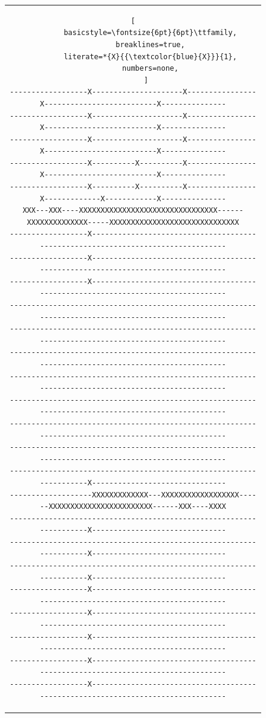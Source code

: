 \documentclass[12pt,a4paper]{article}
\begin{document}
\begin{figure}[H]
\begin{tabular}{c}
\begin{lstlisting}[
        basicstyle=\fontsize{6pt}{6pt}\ttfamily,
        breaklines=true,
        literate=*{X}{{\textcolor{blue}{X}}}{1},
        numbers=none,
      ]
------------------X---------------------X----------------X--------------------------X---------------
------------------X---------------------X----------------X--------------------------X---------------
------------------X---------------------X----------------X--------------------------X---------------
------------------X----------X----------X----------------X--------------------------X---------------
------------------X----------X----------X----------------X-------------X------------X---------------
XXX---XXX----XXXXXXXXXXXXXXXXXXXXXXXXXXXXXXXX------XXXXXXXXXXXXXX-----XXXXXXXXXXXXXXXXXXXXXXXXXXXXXX
------------------X---------------------------------------------------------------------------------
------------------X---------------------------------------------------------------------------------
------------------X---------------------------------------------------------------------------------
----------------------------------------------------------------------------------------------------
----------------------------------------------------------------------------------------------------
----------------------------------------------------------------------------------------------------
----------------------------------------------------------------------------------------------------
----------------------------------------------------------------------------------------------------
----------------------------------------------------------------------------------------------------
----------------------------------------------------------------------------------------------------
--------------------------------------------------------------------X-------------------------------
-------------------XXXXXXXXXXXXX---XXXXXXXXXXXXXXXXXX------XXXXXXXXXXXXXXXXXXXXXXXX------XXX----XXXX
--------------------------------------------------------------------X-------------------------------
--------------------------------------------------------------------X-------------------------------
--------------------------------------------------------------------X-------------------------------
------------------X---------------------------------------------------------------------------------
------------------X---------------------------------------------------------------------------------
------------------X---------------------------------------------------------------------------------
------------------X---------------------------------------------------------------------------------
------------------X---------------------------------------------------------------------------------

\end{lstlisting}
\end{tabular}
\end{figure}
\end{document}
